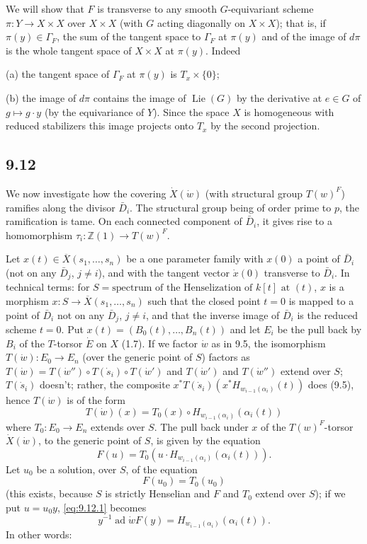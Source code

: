 \documentclass[11pt]{amsart}
\theoremstyle{plain}
\theoremstyle{remark}
\DeclareMathOperator{\ad}{ad}
\DeclareMathOperator{\Lie}{Lie}
\begin{document}
We will show that $F$ is transverse to any smooth $G$-equivariant scheme $\pi: Y \to X \times X$ over $X \times X$ (with $G$ acting diagonally on $X \times X$); that is, if $\pi(y) \in \Gamma_F$, the sum of the tangent space to $\Gamma_F$ at $\pi(y)$ and of the image of $d\pi$ is the whole tangent space of $X \times X$ at $\pi(y)$. Indeed

(a) the tangent space of $\Gamma_F$ at $\pi(y)$ is $T_x \times \{0\}$;

(b) the image of $d\pi$ contains the image of $\Lie(G)$ by the derivative at $e \in G$ of $g \mapsto g \cdot y$ (by the equivariance of $Y$). Since the space $X$ is homogeneous with reduced stabilizers this image projects onto $T_x$ by the second projection.

\subsection{9.12} We now investigate how the covering $\dot{X}(\dot{w})$ (with structural group $T(w)^F$) ramifies along the divisor $\bar{D}_i$. The structural group being of order prime to $p$, the ramification is tame. On each connected component of $\bar{D}_i$, it gives rise to a homomorphism $\tau_i: \mathbb{Z}(1) \to T(w)^F$.

Let $x(t) \in \overline{X}(s_1, \dots, s_n)$ be a one parameter family with $x(0)$ a point of $\bar{D}_i$ (not on any $\bar{D}_j$, $j \neq i$), and with the tangent vector $\dot{x}(0)$ transverse to $\bar{D}_i$. In technical terms: for $S = \text{spectrum of the Henselization of }k[t]\text{ at }(t)$, $x$ is a morphism $x: S \to \overline{X}(s_1, \dots, s_n)$ such that the closed point $t = 0$ is mapped to a point of $\bar{D}_i$ not on any $\bar{D}_j$, $j \neq i$, and that the inverse image of $\bar{D}_i$ is the reduced scheme $t = 0$. Put $x(t) = (B_0(t), \dots, B_n(t))$ and let $E_i$ be the pull back by $B_i$ of the $T$-torsor $\dot{E}$ on $X$ (1.7). If we factor $\dot{w}$ as in 9.5, the isomorphism $T(\dot{w}): E_0 \to E_n$ (over the generic point of $S$) factors as $T(\dot{w}) = T(\dot{w}'') \circ T(\dot{s}_i) \circ T(\dot{w}')$ and $T(\dot{w}')$ and $T(\dot{w}'')$ extend over $S$; $T(\dot{s}_i)$ doesn't; rather, the composite $x^*T(\dot{s}_i)(x^*H_{w_{i-1}(\alpha_i)}(t))$ does (9.5), hence $T(\dot{w})$ is of the form
\[
T(\dot{w})(x) = T_0(x) \circ H_{w_{i-1}(\alpha_i)}(\alpha_i(t))
\]
where $T_0: E_0 \to E_n$ extends over $S$. The pull back under $x$ of the $T(w)^F$-torsor $\dot{X}(\dot{w})$, to the generic point of $S$, is given by the equation
\begin{equation}\label{eq:9.12.1}
F(u) = T_0(u \cdot H_{w_{i-1}(\alpha_i)}(\alpha_i(t))).
\end{equation}
Let $u_0$ be a solution, over $S$, of the equation
\[
F(u_0) = T_0(u_0)
\]
(this exists, because $S$ is strictly Henselian and $F$ and $T_0$ extend over $S$); if we put $u = u_0y$, \eqref{eq:9.12.1} becomes
\begin{equation}\label{eq:9.12.2}
y^{-1} \ad\dot{w}F(y) = H_{w_{i-1}(\alpha_i)}(\alpha_i(t)).
\end{equation}
In other words:
\end{document}
